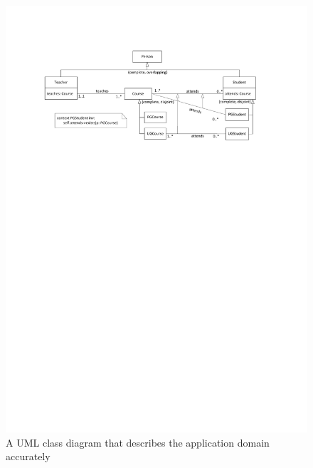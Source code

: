 \documentclass{amsart}
\begin{document}
    \begin{figure}
	\centering \includegraphics[trim = 25mm 200mm 30mm 15mm, clip, scale=0.9]{./UniversityClassDiagramIdeal.pdf}
	\caption{A UML class diagram that describes the application domain accurately}
	\label{fig_UniversityClassDiagramIdeal}
	\end{figure}
 
\end{document}
